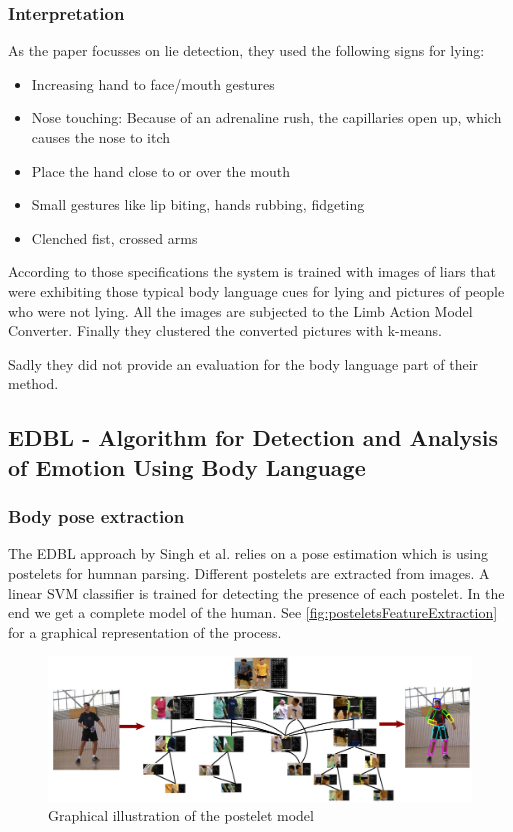 \documentclass[conference]{IEEEtran}
\begin{document}
\subsubsection{Interpretation}
As the paper focusses on lie detection, they used the following signs for lying\cite{kinsey2012,sorjoo,barathi2016lie}:
\begin{itemize}
\item{Increasing hand to face/mouth gestures}
\item{Nose touching: Because of an adrenaline rush, the capillaries open up, which causes the nose to itch}
\item{Place the hand close to or over the mouth}
\item{Small gestures like lip biting, hands rubbing, fidgeting}
\item{Clenched fist, crossed arms}
\end{itemize}
According to those specifications the system is trained with images of liars that were exhibiting those typical body language cues for lying and pictures of people who were not lying. All the images are subjected to the Limb Action Model Converter. Finally they clustered the converted pictures with k-means.\

Sadly they did not provide an evaluation for the body language part of their method.

\subsection{EDBL - Algorithm for Detection and Analysis of Emotion Using Body Language }
\subsubsection{Body pose extraction}
The EDBL approach by Singh et al.\cite{singh2015edbl} relies on a pose estimation which is using postelets for humnan parsing\cite{wang2011learning}. Different postelets are extracted from images. A linear SVM classifier is trained for detecting the presence of each postelet. In the end we get a complete model of the human. See \autoref{fig:posteletsFeatureExtraction} for a graphical representation of the process.

\begin{figure}[H]
\centering
\includegraphics[width=\linewidth]{posteletsFeatureExtraction.jpg}
\caption{Graphical illustration of the postelet model\cite{wang2011learning}}
\label{fig:posteletsFeatureExtraction}
\end{figure}
\end{document}
